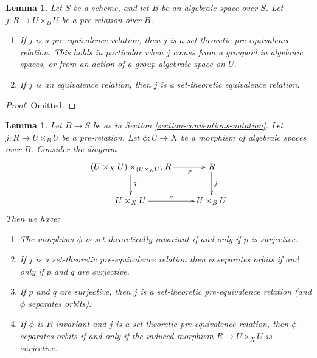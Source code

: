\documentclass{stacks-project}
\theoremstyle{plain}
\newtheorem{lemma}[subsection]{Lemma}
\theoremstyle{definition}
\theoremstyle{remark}
\numberwithin{equation}{subsection}
\begin{document}
\begin{lemma}
\label{lemma-set-theoretic-equivalence}
Let $S$ be a scheme, and let $B$ be an algebraic space over $S$.
Let $j : R \to U \times_B U$ be a pre-relation over $B$.
\begin{enumerate}
\item If $j$ is a pre-equivalence relation, then $j$ is a
set-theoretic pre-equivalence relation. This holds in particular
when $j$ comes from a groupoid in algebraic spaces, or from an
action of a group algebraic space on $U$.
\item If $j$ is an equivalence relation, then $j$ is a
set-theoretic equivalence relation.
\end{enumerate}
\end{lemma}

\begin{proof}
Omitted.
\end{proof}

\begin{lemma}
\label{lemma-separates-orbits}
Let $B \to S$ be as in Section \ref{section-conventions-notation}.
Let $j : R \to U \times_B U$ be a pre-relation.
Let $\phi : U \to X$ be a morphism of algebraic spaces over $B$.
Consider the diagram
$$
\xymatrix{
(U \times_X U) \times_{(U \times_B U)} R \ar[d]^q \ar[r]_-p & R \ar[d]^j \\
U \times_X U \ar[r]^c & U \times_B U
}
$$
Then we have:
\begin{enumerate}
\item The morphism $\phi$ is set-theoretically invariant if and only
if $p$ is surjective.
\item If $j$ is a set-theoretic pre-equivalence relation then
$\phi$ separates orbits if and only if $p$ and $q$ are surjective.
\item If $p$ and $q$ are surjective, then $j$ is a set-theoretic
pre-equivalence relation (and $\phi$ separates orbits).
\item If $\phi$ is $R$-invariant and $j$ is a set-theoretic pre-equivalence
relation, then $\phi$ separates orbits if and only if the induced morphism
$R \to U \times_X U$ is surjective.
\end{enumerate}
\end{lemma}
\end{document}
